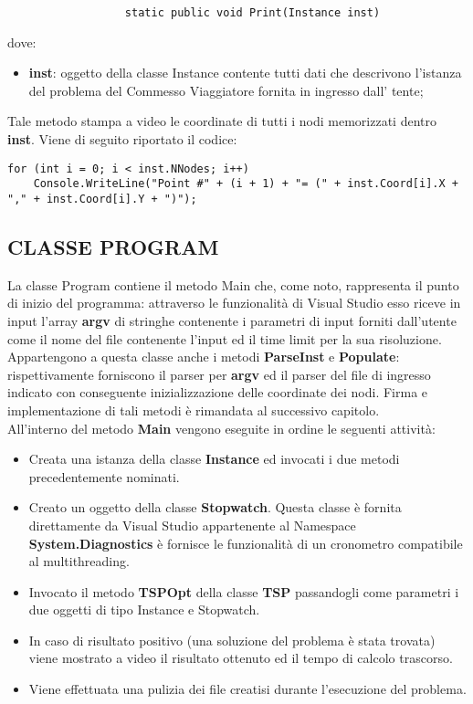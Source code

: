 \documentclass[11pt]{article}
\begin{document}
\begin{lstlisting}
                  static public void Print(Instance inst)
\end{lstlisting}

dove:

\begin{itemize}
\item \textbf{inst}: oggetto della classe Instance contente tutti dati che descrivono l'istanza del problema del Commesso Viaggiatore fornita in ingresso dall' tente;
\end{itemize}

Tale metodo stampa a video le coordinate di tutti i nodi memorizzati dentro \textbf{inst}. Viene di seguito riportato il codice:

\begin{lstlisting}
for (int i = 0; i < inst.NNodes; i++)
    Console.WriteLine("Point #" + (i + 1) + "= (" + inst.Coord[i].X + "," + inst.Coord[i].Y + ")");
\end{lstlisting}

\subsection*{CLASSE PROGRAM}
\label{sec:ClasseProgramS}

La classe Program contiene il metodo Main che, come noto, rappresenta il punto di inizio del programma: attraverso le funzionalità di Visual Studio esso riceve in input l'array \textbf{argv} di stringhe contenente i parametri di input forniti dall'utente come il nome del file contenente l'input ed il time limit per la sua risoluzione. Appartengono a questa classe anche i metodi \textbf{ParseInst} e \textbf{Populate}: rispettivamente forniscono il parser per \textbf{argv} ed il parser del file di ingresso indicato con conseguente inizializzazione delle coordinate dei nodi. Firma e implementazione di tali metodi è rimandata al successivo capitolo.\\
All'interno del metodo \textbf{Main} vengono eseguite in ordine le seguenti attività:
\begin{itemize}
    \item Creata una istanza della classe \textbf{Instance} ed invocati i due metodi precedentemente nominati.
    \item Creato un oggetto della classe \textbf{Stopwatch}. Questa classe è fornita direttamente da Visual Studio appartenente al Namespace \textbf{System.Diagnostics} è fornisce le funzionalità di un cronometro compatibile al multithreading.
    \item Invocato il metodo \textbf{TSPOpt} della classe \textbf{TSP} passandogli come parametri i due oggetti di tipo Instance e Stopwatch.
    \item In caso di risultato positivo (una soluzione del problema è stata trovata) viene mostrato a video il risultato ottenuto ed il tempo di calcolo trascorso.
    \item Viene effettuata una pulizia dei file creatisi durante l'esecuzione del problema.
\end{itemize}
\end{document}
